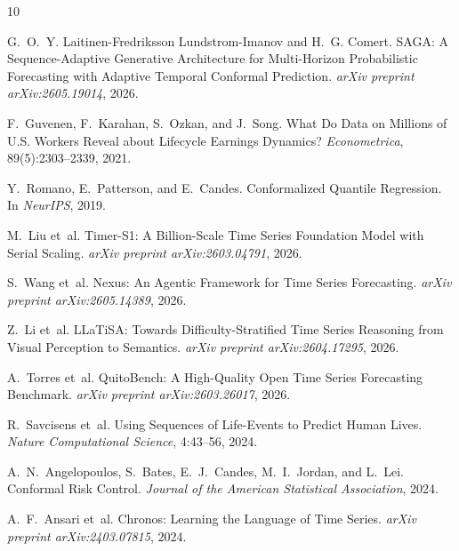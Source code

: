 \documentclass[11pt,a4paper]{article}
\begin{document}

\begin{thebibliography}{10}

G.~O.~Y. Laitinen-Fredriksson Lundstrom-Imanov and H.~G. Comert.
\newblock SAGA: A Sequence-Adaptive Generative Architecture for Multi-Horizon Probabilistic Forecasting with Adaptive Temporal Conformal Prediction.
\newblock \emph{arXiv preprint arXiv:2605.19014}, 2026.

F.~Guvenen, F.~Karahan, S.~Ozkan, and J.~Song.
\newblock What Do Data on Millions of U.S. Workers Reveal about Lifecycle Earnings Dynamics?
\newblock \emph{Econometrica}, 89(5):2303--2339, 2021.

Y.~Romano, E.~Patterson, and E.~Candes.
\newblock Conformalized Quantile Regression.
\newblock In \emph{NeurIPS}, 2019.

M.~Liu et~al.
\newblock Timer-S1: A Billion-Scale Time Series Foundation Model with Serial Scaling.
\newblock \emph{arXiv preprint arXiv:2603.04791}, 2026.

S.~Wang et~al.
\newblock Nexus: An Agentic Framework for Time Series Forecasting.
\newblock \emph{arXiv preprint arXiv:2605.14389}, 2026.

Z.~Li et~al.
\newblock LLaTiSA: Towards Difficulty-Stratified Time Series Reasoning from Visual Perception to Semantics.
\newblock \emph{arXiv preprint arXiv:2604.17295}, 2026.

A.~Torres et~al.
\newblock QuitoBench: A High-Quality Open Time Series Forecasting Benchmark.
\newblock \emph{arXiv preprint arXiv:2603.26017}, 2026.

R.~Savcisens et~al.
\newblock Using Sequences of Life-Events to Predict Human Lives.
\newblock \emph{Nature Computational Science}, 4:43--56, 2024.

A.~N.~Angelopoulos, S.~Bates, E.~J.~Candes, M.~I.~Jordan, and L.~Lei.
\newblock Conformal Risk Control.
\newblock \emph{Journal of the American Statistical Association}, 2024.

A.~F.~Ansari et~al.
\newblock Chronos: Learning the Language of Time Series.
\newblock \emph{arXiv preprint arXiv:2403.07815}, 2024.

\end{thebibliography}
\end{document}
